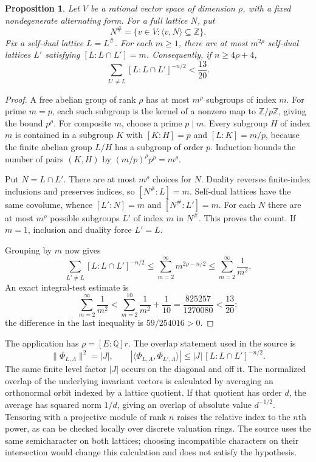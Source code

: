 \documentclass[11pt,a4paper]{article}
\newtheorem{proposition}{Proposition}[section]
\theoremstyle{remark}
\newcommand{\Z}{\mathbb Z}
\newcommand{\Q}{\mathbb Q}
\newcommand{\src}[1]{\cite{#1}}
\begin{document}
\begin{proposition}\label{prop:latticecount}
Let $V$ be a rational vector space of dimension $\rho$, with a fixed nondegenerate alternating form. For a full lattice $N$, put
\[
 N^\#=\{v\in V:\langle v,N\rangle\subseteq\Z\}.
\]
Fix a self-dual lattice $L=L^\#$. For each $m\ge1$, there are at most $m^{2\rho}$ self-dual lattices $L'$ satisfying $[L:L\cap L']=m$. Consequently, if $n\ge4\rho+4$,
\[
 \sum_{L'\ne L}[L:L\cap L']^{-n/2}<\frac{13}{20}.
\]
\end{proposition}
\begin{proof}
A free abelian group of rank $\rho$ has at most $m^\rho$ subgroups of index $m$. For prime $m=p$, each such subgroup is the kernel of a nonzero map to $\Z/p\Z$, giving the bound $p^\rho$. For composite $m$, choose a prime $p\mid m$. Every subgroup $H$ of index $m$ is contained in a subgroup $K$ with $[K:H]=p$ and $[L:K]=m/p$, because the finite abelian group $L/H$ has a subgroup of order $p$. Induction bounds the number of pairs $(K,H)$ by $(m/p)^\rho p^\rho=m^\rho$.

Put $N=L\cap L'$. There are at most $m^\rho$ choices for $N$. Duality reverses finite-index inclusions and preserves indices, so $[N^\#:L]=m$. Self-dual lattices have the same covolume, whence $[L':N]=m$ and $[N^\#:L']=m$. For each $N$ there are at most $m^\rho$ possible subgroups $L'$ of index $m$ in $N^\#$. This proves the count. If $m=1$, inclusion and duality force $L'=L$.

Grouping by $m$ now gives
\[
 \sum_{L'\ne L}[L:L\cap L']^{-n/2}
 \le\sum_{m=2}^{\infty}m^{2\rho-n/2}
 \le\sum_{m=2}^{\infty}\frac1{m^2}.
\]
An exact integral-test estimate is
\[
 \sum_{m=2}^{\infty}\frac1{m^2}
 <\sum_{m=2}^{10}\frac1{m^2}+\frac1{10}
 =\frac{825257}{1270080}<\frac{13}{20};
\]
the difference in the last inequality is $59/254016>0$.
\end{proof}

The application has $\rho=[E:\Q]r$. The overlap statement used in the source is
\[
 \|\Phi_{L,\Lambda}\|^2=|J|,
 \qquad
 |\langle\Phi_{L,\Lambda},\Phi_{L',\Lambda}\rangle|
 \le |J|\,[L:L\cap L']^{-n/2}.
\]
The same finite level factor $|J|$ occurs on the diagonal and off it. The normalized overlap of the underlying invariant vectors is calculated by averaging an orthonormal orbit indexed by a lattice quotient. If that quotient has order $d$, the average has squared norm $1/d$, giving an overlap of absolute value $d^{-1/2}$. Tensoring with a projective module of rank $n$ raises the relative index to the $n$th power, as can be checked locally over discrete valuation rings. The source uses the same semicharacter on both lattices; choosing incompatible characters on their intersection would change this calculation and does not satisfy the hypothesis. \src{S-theta-count}
\end{document}
